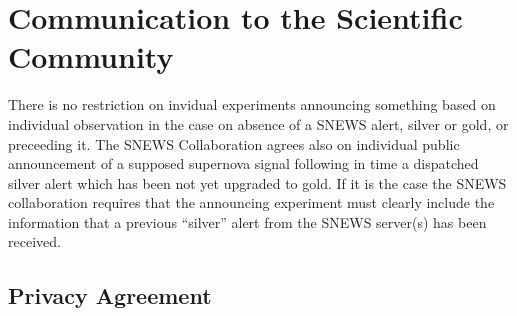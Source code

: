 \documentclass{article}
\begin{document}
\section{Communication to the Scientific Community}
There is no restriction on invidual experiments announcing
something based on individual observation in the case on absence
of a SNEWS alert, silver or gold, or preceeding it.
The SNEWS Collaboration agrees also on individual public announcement of a 
supposed supernova signal following in time a dispatched silver alert
which has been not  yet upgraded to gold. If it is the case the SNEWS 
collaboration requires that the announcing experiment must clearly include the 
information that a previous ``silver'' alert from the SNEWS server(s) has been 
received.
                                         
\subsection{Privacy Agreement}
                                     
\end{document}
